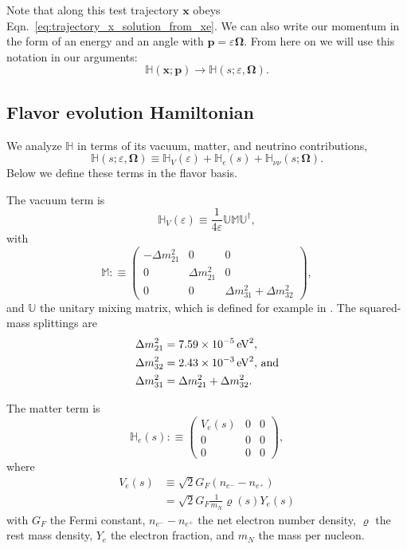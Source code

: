 \documentclass[aps,prd,twocolumn,superscriptaddress,groupedaddress]{revtex4}
\begin{document}
Note that along this test trajectory $\bm{x}$ obeys 
Eqn.~\ref{eq:trajectory_x_solution_from_xe}.
We can also write our momentum in the form of an energy and an angle
with $\bm{p}=\varepsilon\bm{\Omega}$.
From here on we will use this notation in our arguments:
\begin{equation}
  \mathbb{H}(\bm{x};\bm{p}) \rightarrow
  \mathbb{H}(s;\varepsilon,\bm{\Omega}). \nonumber
\end{equation}

\subsection*{Flavor evolution Hamiltonian}
We analyze $\mathbb{H}$ in terms of its vacuum, matter, and neutrino
contributions,
\begin{equation}
  \mathbb{H}(s;\varepsilon,\bm{\Omega}) \equiv
  \mathbb{H}_V(\varepsilon) +
  \mathbb{H}_e(s) +
  \mathbb{H}_{\nu\nu}(s;\bm{\Omega}).
\end{equation}
Below we define these terms in the flavor basis.

The vacuum term is
\begin{equation}
  \mathbb{H}_V(\varepsilon) \equiv \frac{1}{4\varepsilon}
  \mathbb{U}
  \mathbb{M}
  \mathbb{U}^\dagger,
\end{equation}
with
\begin{equation}
  \mathbb{M} :\equiv
  \left(
  \begin{matrix}
    -\Delta m^2_{21} & 0 & 0 \\
    0 & \Delta m^2_{21} & 0 \\
    0 & 0 & \Delta m^2_{31}+\Delta m^2_{32}
  \end{matrix}
  \right),
\end{equation}
and $\mathbb{U}$ the unitary mixing matrix, which is defined for example
in \cite{giun2007-nu_phys_and_astro}.
The squared-mass splittings are
\begin{align}
  \Delta m^2_{21} &= 7.59\times10^{-5}\,{\rm eV}^2, \nonumber\\
  \Delta m^2_{32} &= 2.43\times10^{-3}\,{\rm eV}^2, \,{\rm and} \nonumber \\
  \Delta m^2_{31} &= \Delta m^2_{21}+\Delta m^2_{32}. \nonumber
\end{align}

The matter term is
\begin{equation}
  \mathbb{H}_e(s) :\equiv
  \left(
  \begin{matrix}
    V_e(s) & 0 & 0 \\
    0 & 0 & 0 \\
    0 & 0 & 0
  \end{matrix}
  \right),
\end{equation}
where
\begin{align}
  V_e(s) & \equiv \sqrt{2} G_F (n_{e^-}-n_{e^+}) \nonumber \\
  \label{eq:matter_potential}
  &= \sqrt{2} G_F \frac{1}{m_N}\varrho(s)Y_e(s) 
\end{align}
with $G_F$ the Fermi constant,
$n_{e^-}-n_{e^+}$  the net electron number density,
$\varrho$ the rest mass density,
$Y_e$ the electron fraction, and
$m_N$ the mass per nucleon.
\end{document}
